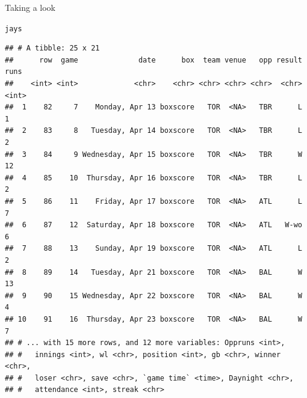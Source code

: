 \documentclass[unknownkeysallowed]{beamer}\usepackage[]{graphicx}\usepackage[]{color}
\makeatletter
\newcommand{\hlstd}[1]{\textcolor[rgb]{0.345,0.345,0.345}{#1}}%
\newenvironment{kframe}{%
 \def\at@end@of@kframe{}%
 \ifinner\ifhmode%
  \def\at@end@of@kframe{\end{minipage}}%
  \begin{minipage}{\columnwidth}%
 \fi\fi%
 \def\FrameCommand##1{\hskip\@totalleftmargin \hskip-\fboxsep
 \colorbox{shadecolor}{##1}\hskip-\fboxsep
     \hskip-\linewidth \hskip-\@totalleftmargin \hskip\columnwidth}%
 \MakeFramed {\advance\hsize-\width
   \@totalleftmargin\z@ \linewidth\hsize
   \@setminipage}}%
 {\par\unskip\endMakeFramed%
 \at@end@of@kframe}
\newenvironment{knitrout}{}{} %
\makeatother
\begin{document}
\begin{frame}[fragile]{Taking a look}
  
\begin{knitrout}\footnotesize
{}\color{fgcolor}\begin{kframe}
\begin{alltt}
\hlstd{jays}
\end{alltt}
\begin{verbatim}
## # A tibble: 25 x 21
##      row  game              date      box  team venue   opp result  runs
##    <int> <int>             <chr>    <chr> <chr> <chr> <chr>  <chr> <int>
##  1    82     7    Monday, Apr 13 boxscore   TOR  <NA>   TBR      L     1
##  2    83     8   Tuesday, Apr 14 boxscore   TOR  <NA>   TBR      L     2
##  3    84     9 Wednesday, Apr 15 boxscore   TOR  <NA>   TBR      W    12
##  4    85    10  Thursday, Apr 16 boxscore   TOR  <NA>   TBR      L     2
##  5    86    11    Friday, Apr 17 boxscore   TOR  <NA>   ATL      L     7
##  6    87    12  Saturday, Apr 18 boxscore   TOR  <NA>   ATL   W-wo     6
##  7    88    13    Sunday, Apr 19 boxscore   TOR  <NA>   ATL      L     2
##  8    89    14   Tuesday, Apr 21 boxscore   TOR  <NA>   BAL      W    13
##  9    90    15 Wednesday, Apr 22 boxscore   TOR  <NA>   BAL      W     4
## 10    91    16  Thursday, Apr 23 boxscore   TOR  <NA>   BAL      W     7
## # ... with 15 more rows, and 12 more variables: Oppruns <int>,
## #   innings <int>, wl <chr>, position <int>, gb <chr>, winner <chr>,
## #   loser <chr>, save <chr>, `game time` <time>, Daynight <chr>,
## #   attendance <int>, streak <chr>
\end{verbatim}
\end{kframe}
\end{knitrout}
  
\end{frame}
\end{document}
